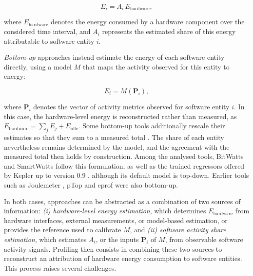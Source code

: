 \documentclass[
  acmsmall,
  screen,
  review,
  xcolor={dvipsnames,usenames}
]{acmart}
\begin{document}
\begin{equation}
E_i = A_i \, E_{\mathrm{hardware}},
\label{eq:general-attribution}
\end{equation}

where $E_{\mathrm{hardware}}$ denotes the energy consumed by a hardware component over the considered time interval, and $A_i$ represents the estimated share of this energy attributable to software entity $i$.

\emph{Bottom-up} approaches instead estimate the energy of each software entity directly, using a model $M$ that maps the activity observed for this entity to energy:

\begin{equation}
E_i = M(\mathbf{P}_i),
\label{eq:bottom-up-attribution}
\end{equation}

where $\mathbf{P}_i$ denotes the vector of activity metrics observed for software entity $i$. In this case, the hardware-level energy is reconstructed rather than measured, as $E_{\mathrm{hardware}} = \sum_j E_j + E_{\mathrm{idle}}$. Some bottom-up tools additionally rescale their estimates so that they sum to a measured total \cite{fieniSmartWattsSelfCalibratingSoftwareDefined2020}. The share of each entity nevertheless remains determined by the model, and the agreement with the measured total then holds by construction. Among the analysed tools, BitWatts \cite{colmantProcesslevelPowerEstimation2015} and SmartWatts \cite{fieniSmartWattsSelfCalibratingSoftwareDefined2020} follow this formulation, as well as the trained regressors offered by Kepler up to version 0.9 \cite{amaralKeplerFrameworkCalculate2023,SustainablecomputingioKepler2026}, although its default model is top-down. Earlier tools such as Joulemeter \cite{kansalVirtualMachinePower2010}, pTop \cite{doPTopProcesslevelPower2009} and eprof \cite{schubertProfilingSoftwareEnergy2012} were also bottom-up.

In both cases, approaches can be abstracted as a combination of two sources of information:
\emph{(i) hardware-level energy estimation}, which determines $E_{\mathrm{hardware}}$ from hardware interfaces, external measurements, or model-based estimation, or provides the reference used to calibrate $M$, and
\emph{(ii) software activity share estimation}, which estimates $A_i$, or the inputs $\mathbf{P}_i$ of $M$, from observable software activity signals.
Profiling then consists in combining these two sources to reconstruct an attribution of hardware energy consumption to software entities. This process raises several challenges.
\end{document}
